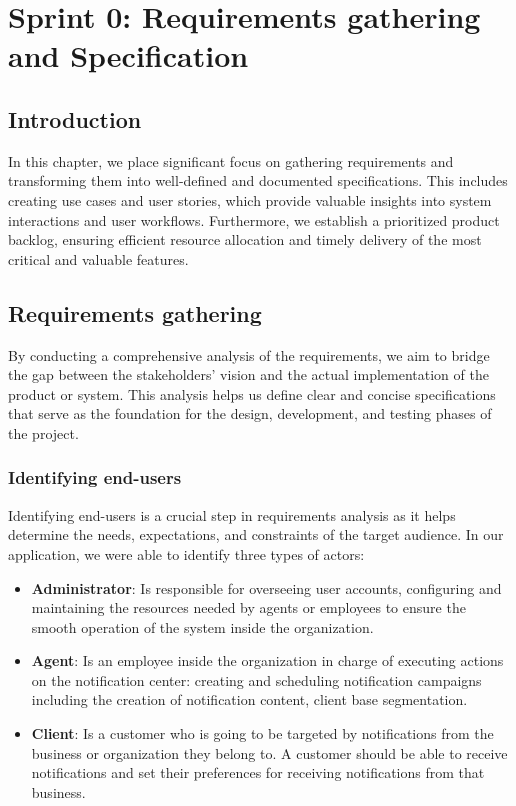 \chapter{Sprint 0: Requirements gathering and Specification}

\section*{Introduction}
In this chapter, we place significant focus on gathering requirements and transforming them 
into well-defined and documented specifications. This includes creating use cases and user stories, 
which provide valuable insights into system interactions and user workflows. Furthermore, we establish 
a prioritized product backlog, ensuring efficient resource allocation and timely delivery of the most 
critical and valuable features. 

\section{Requirements gathering}
By conducting a comprehensive analysis of the requirements, we aim to bridge the gap between 
the stakeholders' vision and the actual implementation of the product or system. 
This analysis helps us define clear and concise specifications that serve as the foundation for the design, 
development, and testing phases of the project.

\subsection{Identifying end-users}
Identifying end-users is a crucial step in requirements analysis as it helps determine the needs, 
expectations, and constraints of the target audience. In our application, we were able to identify 
three types of actors:

\begin{itemize}
    \item \textbf{Administrator}: Is responsible for overseeing user accounts, configuring and maintaining the 
    resources needed by agents or employees to ensure the smooth operation of the system inside the organization.
    
    \item \textbf{Agent}: Is an employee inside the organization in charge of executing actions on the 
    notification center: creating and scheduling notification campaigns including the creation of
    notification content, client base segmentation. 

    \item \textbf{Client}: Is a customer who is going to be targeted by notifications from the business 
    or organization they belong to. A customer should be able to receive notifications and set their 
    preferences for receiving notifications from that business. 
\end{itemize}

